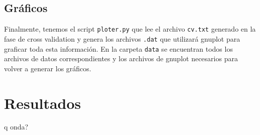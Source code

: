 \documentclass[10pt, a4paper]{article}
\begin{document}
\subsection{Gráficos}

Finalmente, tenemos el script \texttt{ploter.py} que lee el archivo \texttt{cv.txt} generado en la fase de cross validation y genera los archivos \texttt{.dat} que utilizará gnuplot para graficar toda esta información. En la carpeta \texttt{data} se encuentran todos los archivos de datos correspondientes y los archivos de gnuplot necesarios para volver a generar los gráficos.

\section{Resultados}

q onda?
\end{document}
